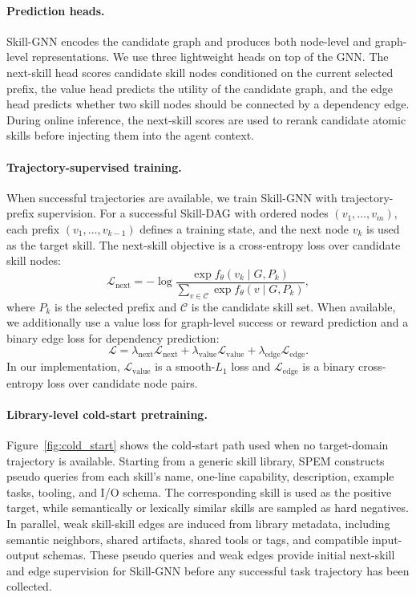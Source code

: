 \documentclass[letterpaper]{article}
\newcommand{\model}{\textsc{SPEM}}
\begin{document}
\paragraph{Prediction heads.}
Skill-GNN encodes the candidate graph and produces both node-level and
graph-level representations. We use three lightweight heads on top of the GNN.
The next-skill head scores candidate skill nodes conditioned on the current
selected prefix, the value head predicts the utility of the candidate graph, and
the edge head predicts whether two skill nodes should be connected by a
dependency edge. During online inference, the next-skill scores are used to
rerank candidate atomic skills before injecting them into the agent context.

\paragraph{Trajectory-supervised training.}
When successful trajectories are available, we train Skill-GNN with
trajectory-prefix supervision. For a successful Skill-DAG with ordered nodes
$(v_1,\ldots,v_m)$, each prefix $(v_1,\ldots,v_{k-1})$ defines a training state,
and the next node $v_k$ is used as the target skill. The next-skill objective is
a cross-entropy loss over candidate skill nodes:
\[
\mathcal{L}_{\mathrm{next}}
=
-\log
\frac{\exp f_\theta(v_k \mid G, P_k)}
{\sum_{v \in \mathcal{C}}\exp f_\theta(v \mid G, P_k)},
\]
where $P_k$ is the selected prefix and $\mathcal{C}$ is the candidate skill set.
When available, we additionally use a value loss for graph-level success or
reward prediction and a binary edge loss for dependency prediction:
\[
\mathcal{L}
=
\lambda_{\mathrm{next}}\mathcal{L}_{\mathrm{next}}
+
\lambda_{\mathrm{value}}\mathcal{L}_{\mathrm{value}}
+
\lambda_{\mathrm{edge}}\mathcal{L}_{\mathrm{edge}}.
\]
In our implementation, $\mathcal{L}_{\mathrm{value}}$ is a smooth-$L_1$ loss and
$\mathcal{L}_{\mathrm{edge}}$ is a binary cross-entropy loss over candidate node
pairs.

\paragraph{Library-level cold-start pretraining.}
Figure~\ref{fig:cold_start} shows the cold-start path used when no
target-domain trajectory is available. Starting from a generic skill library,
\model{} constructs pseudo queries from each skill's name, one-line capability,
description, example tasks, tooling, and I/O schema. The corresponding skill is
used as the positive target, while semantically or lexically similar skills are
sampled as hard negatives. In parallel, weak skill-skill edges are induced from
library metadata, including semantic neighbors, shared artifacts, shared tools
or tags, and compatible input-output schemas. These pseudo queries and weak
edges provide initial next-skill and edge supervision for Skill-GNN before any
successful task trajectory has been collected.
\end{document}
